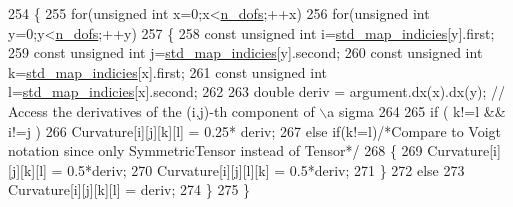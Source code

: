 \begin{DoxyCode}
254     \{
255          \textcolor{keywordflow}{for}(\textcolor{keywordtype}{unsigned} \textcolor{keywordtype}{int} x=0;x<\hyperlink{classSacado__Wrapper_1_1SymTensor2_ad9d6542de5481e0d41bd1831cb0aeaff}{n\_dofs};++x)
256             \textcolor{keywordflow}{for}(\textcolor{keywordtype}{unsigned} \textcolor{keywordtype}{int} y=0;y<\hyperlink{classSacado__Wrapper_1_1SymTensor2_ad9d6542de5481e0d41bd1831cb0aeaff}{n\_dofs};++y)
257             \{
258                 \textcolor{keyword}{const} \textcolor{keywordtype}{unsigned} \textcolor{keywordtype}{int} i=\hyperlink{classSacado__Wrapper_1_1SymTensor2_a1c6b89438714315ae209f4687b687505}{std\_map\_indicies}[y].first;
259                 \textcolor{keyword}{const} \textcolor{keywordtype}{unsigned} \textcolor{keywordtype}{int} j=\hyperlink{classSacado__Wrapper_1_1SymTensor2_a1c6b89438714315ae209f4687b687505}{std\_map\_indicies}[y].second;
260                 \textcolor{keyword}{const} \textcolor{keywordtype}{unsigned} \textcolor{keywordtype}{int} k=\hyperlink{classSacado__Wrapper_1_1SymTensor2_a1c6b89438714315ae209f4687b687505}{std\_map\_indicies}[x].first;
261                 \textcolor{keyword}{const} \textcolor{keywordtype}{unsigned} \textcolor{keywordtype}{int} l=\hyperlink{classSacado__Wrapper_1_1SymTensor2_a1c6b89438714315ae209f4687b687505}{std\_map\_indicies}[x].second;
262 
263                 \textcolor{keywordtype}{double} deriv = argument.dx(x).dx(y); \textcolor{comment}{// Access the derivatives of the (i,j)-th component of
       \(\backslash\)a sigma}
264 
265                 \textcolor{keywordflow}{if} ( k!=l && i!=j )
266                     Curvature[i][j][k][l] = 0.25* deriv;
267                 \textcolor{keywordflow}{else} \textcolor{keywordflow}{if}(k!=l)\textcolor{comment}{/*Compare to Voigt notation since only SymmetricTensor instead of Tensor*/}
268                 \{
269                     Curvature[i][j][k][l] = 0.5*deriv;
270                     Curvature[i][j][l][k] = 0.5*deriv;
271                 \}
272                 \textcolor{keywordflow}{else}
273                     Curvature[i][j][k][l] = deriv;
274             \}
275     \}
\end{DoxyCode}
